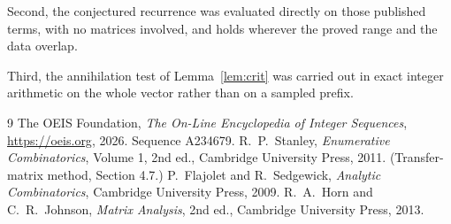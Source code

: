 \documentclass[11pt,a4paper]{article}
\theoremstyle{plain}
\theoremstyle{definition}
\begin{document}
Second, the conjectured recurrence was evaluated directly on those published terms, with no
matrices involved, and holds wherever the proved range and the data overlap.

Third, the annihilation test of Lemma~\ref{lem:crit} was carried out in exact integer
arithmetic on the whole vector rather than on a sampled prefix.

\begin{thebibliography}{9}
 The OEIS Foundation, \emph{The On-Line Encyclopedia of Integer
Sequences}, \url{https://oeis.org}, 2026. Sequence A234679.
 R.~P.~Stanley, \emph{Enumerative Combinatorics}, Volume 1, 2nd ed.,
Cambridge University Press, 2011. (Transfer-matrix method, Section 4.7.)
 P.~Flajolet and R.~Sedgewick, \emph{Analytic Combinatorics}, Cambridge
University Press, 2009.
 R.~A.~Horn and C.~R.~Johnson, \emph{Matrix Analysis}, 2nd ed., Cambridge
University Press, 2013.
\end{thebibliography}
\end{document}
